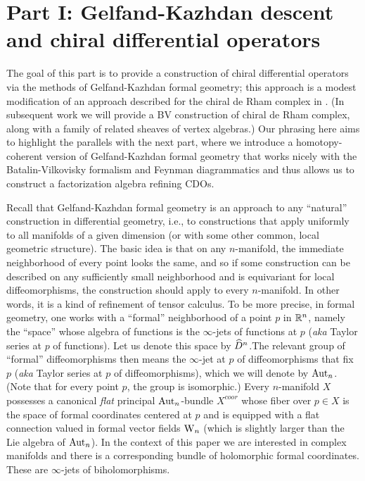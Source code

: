 \part*{Part I: Gelfand-Kazhdan descent and chiral differential
  operators}
  
The goal of this part is to provide a construction of chiral differential operators via the methods of Gelfand-Kazhdan formal geometry; this approach is a modest modification of an approach described for the chiral de Rham complex in \cite{MSV}. (In subsequent work we will provide a BV construction of chiral de Rham complex, along with a family of related sheaves of vertex algebras.) Our phrasing here aims to highlight the parallels with the next part, where we introduce a homotopy-coherent version of Gelfand-Kazhdan formal geometry that works nicely with the Batalin-Vilkovisky formalism and Feynman diagrammatics and thus allows us to construct a factorization algebra refining CDOs.

Recall that Gelfand-Kazhdan formal geometry is an approach to any ``natural'' construction in differential geometry, i.e., to constructions that apply uniformly to all manifolds of a given dimension (or with some other common, local geometric structure). The basic idea is that on any $n$-manifold, the immediate neighborhood of every point looks the same, and so if some construction can be described on any sufficiently small neighborhood and is equivariant for local diffeomorphisms, the construction should apply to every $n$-manifold. In other words, it is a kind of refinement of tensor calculus. To be more precise, in formal geometry, one works with a ``formal'' neighborhood of a point $p$ in $\mathbb R^n$, namely the ``space'' whose algebra of functions is the $\infty$-jets of functions at $p$ ({\em aka} Taylor series at $p$ of functions). Let us denote this space by $\widehat{D}^n$.The relevant group of ``formal'' diffeomorphisms then means the $\infty$-jet at $p$ of diffeomorphisms that fix $p$ ({\em aka} Taylor series at $p$ of diffeomorphisms), which we will denote by ${\rm Aut}_n$. (Note that for every point $p$, the group is isomorphic.) Every $n$-manifold $X$ possesses a canonical {\em flat} principal ${\rm Aut}_n$-bundle $X^{coor}$ whose fiber over $p \in X$ is the space of formal coordinates centered at $p$ and is equipped with a flat connection valued in formal vector fields ${{\rm W}_n}$ (which is slightly larger than the Lie algebra of ${\rm Aut}_n$).  In the context of this paper we are interested in complex manifolds and there is a corresponding bundle of holomorphic formal coordinates. These are $\infty$-jets of biholomorphisms.

